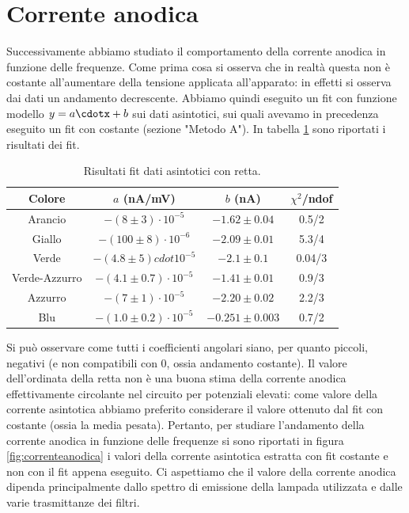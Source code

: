\documentclass[10pt,a4paper]{article}
\begin{document}
\section{Corrente anodica}
Successivamente abbiamo studiato il comportamento della corrente anodica in funzione delle frequenze.
Come prima cosa si osserva che in realtà questa non è costante all'aumentare della tensione applicata all'apparato: in effetti si osserva dai dati un andamento decrescente. Abbiamo quindi eseguito un fit con funzione modello $y = a\cdotx + b$ sui dati asintotici, sui quali avevamo in precedenza eseguito un fit con costante (sezione "Metodo A").
In tabella \ref{tab:fitasintoticoretta} sono riportati i risultati dei fit.
\begin{table}[!htb]
\centering
\begin{tabular}{|c|c|c|c|}
\hline
Colore & $a$ (nA/mV) & $b$ (nA) & $\chi ^2$/ndof\\
\hline
Arancio & $-(8\pm 3)\cdot 10 ^ {-5}$ & $-1.62 \pm 0.04$ & 0.5/2\\
\hline
Giallo & $-(100\pm 8)\cdot 10 ^ {-6}$ & $-2.09\pm0.01$ & 5.3/4\\
\hline
Verde & $-(4.8\pm 5)cdot 10 ^ {-5}$ & $-2.1\pm 0.1$ & 0.04/3\\
\hline
Verde-Azzurro & $-(4.1\pm0.7)\cdot 10 ^ {-5}$ & $-1.41\pm0.01$ & 0.9/3\\
\hline
Azzurro & $-(7\pm 1)\cdot 10 ^ {-5}$ & $-2.20\pm 0.02$ & 2.2/3\\
\hline
Blu & $-(1.0\pm 0.2)\cdot 10 ^ {-5}$ & $-0.251\pm 0.003$ & 0.7/2\\ 
\hline
\end{tabular}
\caption{Risultati fit dati asintotici con retta.\label{tab:fitasintoticoretta}}
\end{table}
Si può osservare come tutti i coefficienti angolari siano, per quanto piccoli, negativi (e non compatibili con 0, ossia andamento costante).
Il valore dell'ordinata della retta non è una buona stima della corrente anodica effettivamente circolante nel circuito per potenziali elevati: come valore della corrente asintotica abbiamo preferito considerare il valore ottenuto dal fit con costante (ossia la media pesata).
Pertanto, per studiare l'andamento della corrente anodica in funzione delle frequenze si sono riportati in figura \ref{fig:correnteanodica} i valori della corrente asintotica estratta con fit costante e non con il fit appena eseguito. Ci aspettiamo che il valore della corrente anodica dipenda principalmente dallo spettro di emissione della lampada utilizzata e dalle varie trasmittanze dei filtri.
\end{document}
